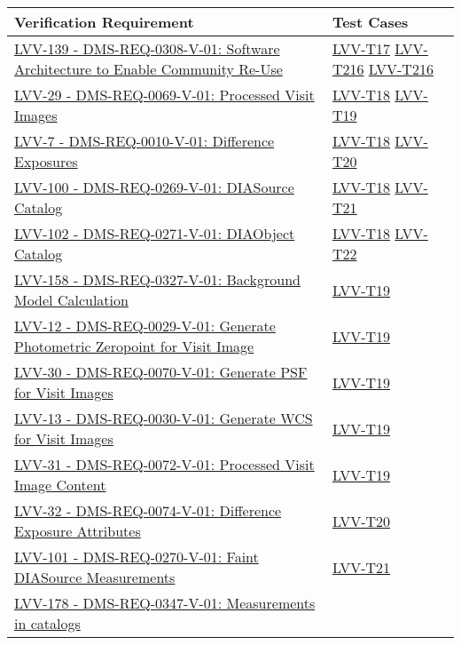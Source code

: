\scriptsize{
\begin{longtable}[]{p{13cm}p{3cm}}
\toprule
Verification Requirement & Test Cases\tabularnewline
\midrule
\endhead

\href{https://jira.lsstcorp.org/browse/LVV-139}{LVV-139 - DMS-REQ-0308-V-01: Software Architecture to Enable Community Re-Use}
& {
\hyperref[lvv-t17]{LVV-T17}
\hyperref[lvv-t216]{LVV-T216}
\hyperref[lvv-t216]{LVV-T216}
} \\
\href{https://jira.lsstcorp.org/browse/LVV-29}{LVV-29 - DMS-REQ-0069-V-01: Processed Visit Images}
& {
\hyperref[lvv-t18]{LVV-T18}
\hyperref[lvv-t19]{LVV-T19}
} \\
\href{https://jira.lsstcorp.org/browse/LVV-7}{LVV-7 - DMS-REQ-0010-V-01: Difference Exposures}
& {
\hyperref[lvv-t18]{LVV-T18}
\hyperref[lvv-t20]{LVV-T20}
} \\
\href{https://jira.lsstcorp.org/browse/LVV-100}{LVV-100 - DMS-REQ-0269-V-01: DIASource Catalog}
& {
\hyperref[lvv-t18]{LVV-T18}
\hyperref[lvv-t21]{LVV-T21}
} \\
\href{https://jira.lsstcorp.org/browse/LVV-102}{LVV-102 - DMS-REQ-0271-V-01: DIAObject Catalog}
& {
\hyperref[lvv-t18]{LVV-T18}
\hyperref[lvv-t22]{LVV-T22}
} \\
\href{https://jira.lsstcorp.org/browse/LVV-158}{LVV-158 - DMS-REQ-0327-V-01: Background Model Calculation}
& {
\hyperref[lvv-t19]{LVV-T19}
} \\
\href{https://jira.lsstcorp.org/browse/LVV-12}{LVV-12 - DMS-REQ-0029-V-01: Generate Photometric Zeropoint for Visit Image}
& {
\hyperref[lvv-t19]{LVV-T19}
} \\
\href{https://jira.lsstcorp.org/browse/LVV-30}{LVV-30 - DMS-REQ-0070-V-01: Generate PSF for Visit Images}
& {
\hyperref[lvv-t19]{LVV-T19}
} \\
\href{https://jira.lsstcorp.org/browse/LVV-13}{LVV-13 - DMS-REQ-0030-V-01: Generate WCS for Visit Images}
& {
\hyperref[lvv-t19]{LVV-T19}
} \\
\href{https://jira.lsstcorp.org/browse/LVV-31}{LVV-31 - DMS-REQ-0072-V-01: Processed Visit Image Content}
& {
\hyperref[lvv-t19]{LVV-T19}
} \\
\href{https://jira.lsstcorp.org/browse/LVV-32}{LVV-32 - DMS-REQ-0074-V-01: Difference Exposure Attributes}
& {
\hyperref[lvv-t20]{LVV-T20}
} \\
\href{https://jira.lsstcorp.org/browse/LVV-101}{LVV-101 - DMS-REQ-0270-V-01: Faint DIASource Measurements}
& {
\hyperref[lvv-t21]{LVV-T21}
} \\
\href{https://jira.lsstcorp.org/browse/LVV-178}{LVV-178 - DMS-REQ-0347-V-01: Measurements in catalogs}

\end{longtable}}
